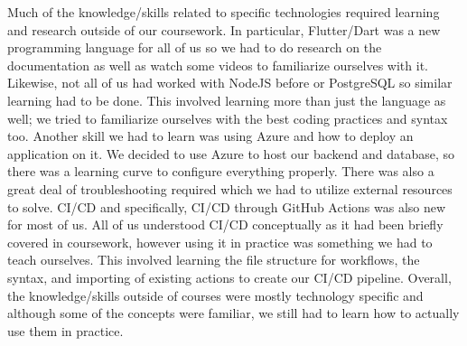 \documentclass{article}
\begin{document}

Much of the knowledge/skills related to specific technologies required learning and research outside of our coursework.
In particular, Flutter/Dart was a new programming language for all of us so we had to do research on the documentation as well
as watch some videos to familiarize ourselves with it. Likewise, not all of us had worked with NodeJS before or PostgreSQL
so similar learning had to be done. This involved learning more than just the language as well; we tried to familiarize ourselves
with the best coding practices and syntax too. Another skill we had to learn was using Azure and how to deploy an application on it.
We decided to use Azure to host our backend and database, so there was a learning curve to configure everything properly. There was
also a great deal of troubleshooting required which we had to utilize external resources to solve. CI/CD and specifically,
CI/CD through GitHub Actions was also new for most of us. All of us understood CI/CD conceptually as it had been briefly
covered in coursework, however using it in practice was something we had to teach ourselves. This involved learning the
file structure for workflows, the syntax, and importing of existing actions to create our CI/CD pipeline. Overall, the knowledge/skills
outside of courses were mostly technology specific and although some of the concepts were familiar, we still had to learn how
to actually use them in practice.
\end{document}

